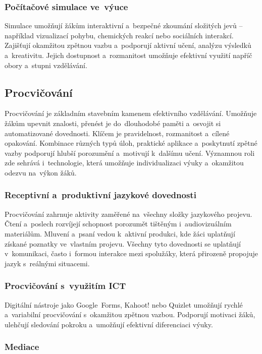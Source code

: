 \documentclass[male,czech,api_bc]{kitheses}
\begin{document}
\subsubsection{Počítačové simulace ve~výuce}

Simulace umožňují žákům interaktivní a~bezpečné zkoumání složitých jevů – například vizualizací pohybu, chemických reakcí nebo sociálních interakcí. Zajišťují okamžitou zpětnou vazbu a~podporují aktivní učení, analýzu výsledků a~kreativitu. Jejich dostupnost a~rozmanitost umožňuje efektivní využití napříč obory a~stupni vzdělávání.

\subsection{Procvičování}

Procvičování je základním stavebním kamenem efektivního vzdělávání. Umožňuje žákům upevnit znalosti, přenést je do~dlouhodobé paměti a~osvojit si automatizované dovednosti. Klíčem je pravidelnost, rozmanitost a~cílené opakování. Kombinace různých typů úloh, praktické aplikace a~poskytnutí zpětné vazby podporují hlubší porozumění a~motivují k~dalšímu učení. Významnou roli zde sehrává i~technologie, která umožňuje individualizaci výuky a~okamžitou odezvu na~výkon žáků.

\subsubsection{Receptivní a~produktivní jazykové dovednosti}

Procvičování zahrnuje aktivity zaměřené na~všechny složky jazykového projevu. Čtení a~poslech rozvíjejí schopnost porozumět tištěným i~audiovizuálním materiálům. Mluvení a~psaní vedou k~aktivní produkci, kde žáci uplatňují získané poznatky ve~vlastním projevu. Všechny tyto dovednosti se uplatňují v~komunikaci, často i~formou interakce mezi spolužáky, která přirozeně propojuje jazyk s~reálnými situacemi.

\subsubsection{Procvičování s~využitím ICT}

Digitální nástroje jako Google~Forms, Kahoot! nebo Quizlet umožňují rychlé a~variabilní procvičování s~okamžitou zpětnou vazbou. Podporují motivaci žáků, ulehčují sledování pokroku a~umožňují efektivní diferenciaci výuky.

\subsubsection{Mediace}
\end{document}
